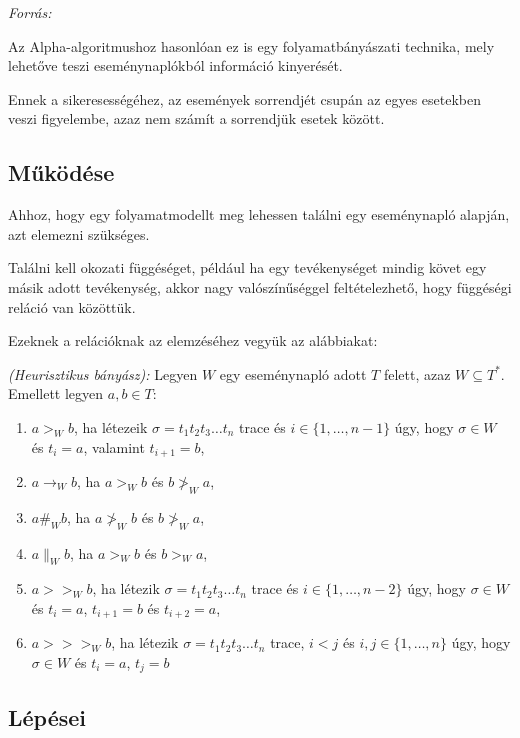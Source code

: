 \textit{Forrás: \cite{wiki:001}}


Az Alpha-algoritmushoz hasonlóan ez is egy folyamatbányászati technika, mely lehetőve teszi eseménynaplókból információ kinyerését.

Ennek a sikeresességéhez, az események sorrendjét csupán az egyes esetekben veszi figyelembe, azaz nem számít a sorrendjük esetek között.

\subsection{Működése}

Ahhoz, hogy egy folyamatmodellt meg lehessen találni egy eseménynapló alapján, azt elemezni szükséges.

Találni kell okozati függéséget, például ha egy tevékenységet mindig követ egy másik adott tevékenység, akkor nagy valószínűséggel feltételezhető, hogy függéségi reláció van közöttük. 

Ezeknek a relációknak az elemzéséhez vegyük az alábbiakat:

\begin{definition}{\textit{(Heurisztikus bányász):}} Legyen $W$ egy eseménynapló adott $T$ felett, azaz $W \subseteq T^*$. Emellett legyen $a,b \in T:$
\begin{enumerate}

\item $ a>_W b $, ha létezeik $\sigma = t_1 t_2 t_3 \ldots t_n $ trace és $i \in \{1, \ldots ,n-1\}$ úgy, hogy $\sigma \in W$ és $t_i=a$, valamint $t_{i+1}=b$,
\item $ a \rightarrow_W b $, ha $a>_W b$ és $b\ngtr_W a$, 
\item $ a\#_Wb $, ha $a \ngtr_W b$ és $b\ngtr_W a$,
\item $a\parallel_Wb $, ha $a>_W b$ és $b>_Wa$,
\item $a >>_Wb$, ha létezik $\sigma = t_1 t_2 t_3 \ldots t_n $ trace és $i \in \{1, \ldots ,n-2\}$ úgy, hogy $\sigma \in W$ és $t_i=a$, $t_{i+1}=b$ és $t_{i+2}=a$,
\item $a>>>_Wb$, ha létezik $\sigma = t_1 t_2 t_3 \ldots t_n $ trace, $i<j$ és $i,j \in \{1,\ldots,n\}$ úgy, hogy $\sigma \in W$ és $t_i=a$, $t_j=b$

\end{enumerate}
\end{definition}

\subsection{Lépései}

